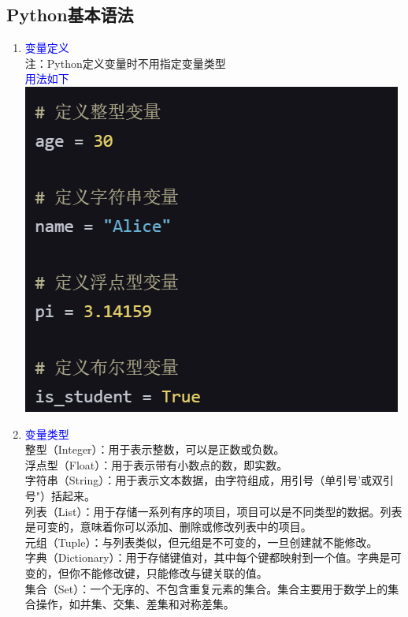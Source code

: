 \documentclass[12pt,a4paper,UTF8]{article}
\begin{document}
    \subsection{Python基本语法}
    \begin{enumerate}
        \item \textcolor{blue}{变量定义}\\
        注：Python定义变量时不用指定变量类型\\
        \textcolor{blue}{用法如下}\\
        \includegraphics[scale=0.5]{pictures/2.png}
        \item \textcolor{blue}{变量类型}\\
        整型（Integer）：用于表示整数，可以是正数或负数。\\
        浮点型（Float）：用于表示带有小数点的数，即实数。\\
        字符串（String）：用于表示文本数据，由字符组成，用引号（单引号'或双引号"）括起来。\\
        列表（List）：用于存储一系列有序的项目，项目可以是不同类型的数据。列表是可变的，意味着你可以添加、删除或修改列表中的项目。\\
        元组（Tuple）：与列表类似，但元组是不可变的，一旦创建就不能修改。\\
        字典（Dictionary）：用于存储键值对，其中每个键都映射到一个值。字典是可变的，但你不能修改键，只能修改与键关联的值。\\
        集合（Set）：一个无序的、不包含重复元素的集合。集合主要用于数学上的集合操作，如并集、交集、差集和对称差集。\\

\end{enumerate}
\end{document}
